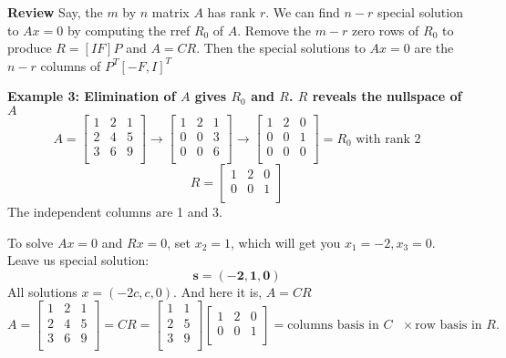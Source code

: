 \textbf{Review} Say, the \(m\) by \(n\) matrix \(A\) has rank \(r\). We can find \(n - r\) special solution to \(Ax = 0\)  by computing the rref \(R_0\) of \(A\). Remove the \(m - r\) zero rows of \(R_0\) to produce \(R = [I F] P\) and \(A = CR\). Then the special solutions to \(Ax = 0\) are the \(n - r\) columns of \(P^T [-F, I]^T\)  

\textbf{Example 3: Elimination of \(A\) gives \(R_0\) and \(R\). \(R\) reveals the nullspace of \(A\) } 
\[
    A =
    \begin{bmatrix}
        1 & 2 & 1  \\
        2 & 4 & 5  \\
        3 & 6 & 9  \\
    \end{bmatrix}
    \rightarrow
    \begin{bmatrix}
        1 & 2 & 1  \\
        0 & 0 & 3  \\
        0 & 0 & 6  \\
    \end{bmatrix}
    \rightarrow
    \begin{bmatrix}
        1 & 2 & 0  \\
        0 & 0 & 1  \\
        0 & 0 & 0  \\
    \end{bmatrix}
    = R_0
    \text{ with rank 2}
\]
\[
    R = 
    \begin{bmatrix}
        1 & 2 & 0  \\
        0 & 0 & 1  \\
    \end{bmatrix}
\]
The independent columns are 1 and 3. 

To solve \(Ax = 0\) and \(Rx = 0\), set \(x_2 = 1\), which will get you \(x_1 = -2, x_3 = 0\). Leave us special solution:
\[
    \mathbf{s = (-2, 1, 0)}  
\]  
All solutions \(x = (-2c, c, 0)\). And here it is, \(A = CR\)
\[
     A =
    \begin{bmatrix}
        1 & 2 & 1  \\
        2 & 4 & 5  \\
        3 & 6 & 9  \\
    \end{bmatrix}
    = CR =
    \begin{bmatrix}
        1 & 1  \\
        2 & 5  \\
        3 & 9  \\
    \end{bmatrix}
    \begin{bmatrix}
        1 & 2 & 0  \\
        0 & 0 & 1  \\
    \end{bmatrix}
    = 
    \text{columns basis in \(C\) } \times \text{row basis in \(R\).}
\]  

